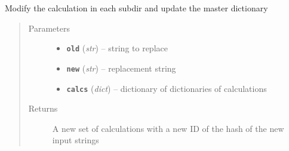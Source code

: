 \documentclass[letterpaper,10pt,english]{sphinxmanual}
\begin{document}

\begin{fulllineitems}
\label{prep:prep.generateAnotherCalc}
Modify the calculation in each subdir and update the master dictionary
\begin{quote}\begin{description}
\item[{Parameters}] \leavevmode\begin{itemize}
\item {} 
\textbf{\texttt{old}} (\emph{str}) -- string to replace

\item {} 
\textbf{\texttt{new}} (\emph{str}) -- replacement string

\item {} 
\textbf{\texttt{calcs}} (\emph{dict}) -- dictionary of dictionaries of calculations

\end{itemize}

\item[{Returns}] \leavevmode
A new set of calculations with a new ID of the hash of the new input strings

\end{description}\end{quote}

\end{fulllineitems}


\begin{fulllineitems}
\label{prep:prep.getMPGrid}
\end{fulllineitems}

\end{document}
